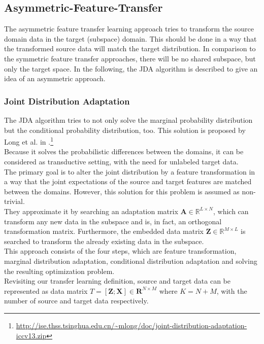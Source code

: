 \subsection{Asymmetric-Feature-Transfer}\label{TlSubSecHomoAsymFeature}
The asymmetric feature transfer learning approach tries to transform the source domain data in the target (subspace) domain.
This should be done in a way that the transformed source data will match the target distribution.
In comparison to the symmetric feature transfer approaches, there will be no shared subspace, but only the target space.
In the following, the \ac{JDA} algorithm is described to give an idea of an asymmetric approach.\cite[p. 6; 10]{Weiss.2016}
\subsubsection{Joint Distribution Adaptation}
The \acl{JDA} algorithm tries to not only solve the marginal probability distribution but the conditional probability distribution, too.
This solution is proposed by Long et al. in \cite{Long.}.\footnote{\url{http://ise.thss.tsinghua.edu.cn/~mlong/doc/joint-distribution-adaptation-iccv13.zip}}\\
Because it solves the probabilistic differences between the domains, it can be considered as transductive setting, with the need for unlabeled target data.\\
The primary goal is to alter the joint distribution by a feature transformation in a way that the joint expectations of the source and target features are matched between the domains.
However, this solution for this problem is assumed as non-trivial.\cite{Long.}\\
They approximate it by searching an adaptation matrix $\mathbf{A} \in \mathbb{R}^{L \times N }$, which can transform any new data in the subspace and is, in fact, an orthogonal transformation matrix.
Furthermore, the embedded data matrix $\mathbf{Z} \in \mathbb{R}^{M\times L}$ is searched to transform the already existing data in the subspace.\cite{Long.}\\
This approach consists of the four steps, which are feature transformation, marginal distribution adaptation, conditional distribution adaptation and solving the resulting optimization problem.\cite{Long.}\\
Revisiting our transfer learning definition, source and target data can be represented as data matrix $T = [\mathbf{Z};\mathbf{X}] \in \mathbf{R}^{N\times M}$ where $K = N+M$, with the number of source and target data respectively.
